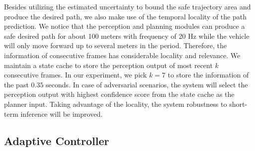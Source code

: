Besides utilizing the estimated uncertainty to bound the safe trajectory area and produce the desired path, we also make use of the temporal locality of the path prediction. We notice that the perception and planning modules can produce a safe desired path for about 100 meters with frequency of 20 Hz while the vehicle will only move forward up to several meters in the period. Therefore, the information of consecutive frames has considerable locality and relevance. We maintain a state cache to store the perception output of most recent $k$ consecutive frames. In our experiment, we pick $k=7$ to store the information of the past $0.35$ seconds. In case of adversarial scenarios, the system will select the perception output with highest confidence score from the state cache as the planner input. Taking advantage of the locality, the system robustness to short-term inference will be improved.  

\subsection{Adaptive Controller}

